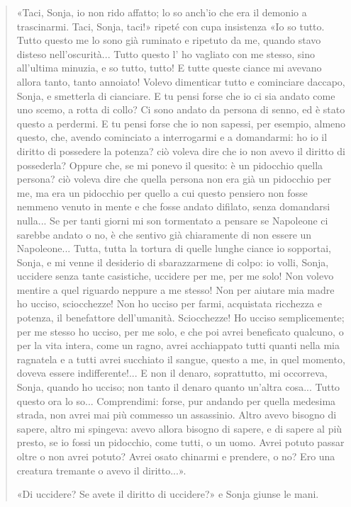 \documentclass{book}
\begin{document}
\begin{quote}
«Taci, Sonja, io non rido affatto; lo so anch’io che era il demonio a trascinarmi. Taci, Sonja,
taci!» ripeté con cupa insistenza «Io so tutto. Tutto questo me lo sono già ruminato e ripetuto
da me, quando stavo disteso nell’oscurità... Tutto questo l' ho vagliato con me stesso, sino
all'ultima minuzia, e so tutto, tutto! E tutte queste ciance mi avevano allora tanto, tanto
annoiato! Volevo dimenticar tutto e cominciare daccapo, Sonja, e smetterla di cianciare. E tu
pensi forse che io ci sia andato come uno scemo, a rotta di collo? Ci sono andato da persona di
senno, ed è stato questo a perdermi. E tu pensi forse che io non sapessi, per esempio, almeno
questo, che, avendo cominciato a interrogarmi e a domandarmi: ho io il diritto di possedere la
potenza? ciò voleva dire che io non avevo il diritto di possederla? Oppure che, se mi ponevo il
quesito: è un pidocchio quella persona? ciò voleva dire che quella persona non era già un
pidocchio per me, ma era un pidocchio per quello a cui questo pensiero non fosse nemmeno
venuto in mente e che fosse andato difilato, senza domandarsi nulla... Se per tanti giorni mi son
tormentato a pensare se Napoleone ci sarebbe andato o no, è che sentivo già chiaramente di
non essere un Napoleone... Tutta, tutta la tortura di quelle lunghe ciance io sopportai, Sonja, e
mi venne il desiderio di sbarazzarmene di colpo: io volli, Sonja, uccidere senza tante casistiche,
uccidere per me, per me solo! Non volevo mentire a quel riguardo neppure a me stesso! Non
per aiutare mia madre ho ucciso, sciocchezze! Non ho ucciso per farmi, acquistata ricchezza e
potenza, il benefattore dell'umanità. Sciocchezze! Ho ucciso semplicemente; per me stesso ho
ucciso, per me solo, e che poi avrei beneficato qualcuno, o per la vita intera, come un ragno, avrei acchiappato tutti quanti nella mia ragnatela e a tutti avrei succhiato il sangue, questo a me,
in quel momento, doveva essere indifferente!... E non il denaro, soprattutto, mi occorreva,
Sonja, quando ho ucciso; non tanto il denaro quanto un'altra cosa... Tutto questo ora lo so...
Comprendimi: forse, pur andando per quella medesima strada, non avrei mai più commesso un
assassinio. Altro avevo bisogno di sapere, altro mi spingeva: avevo allora bisogno di sapere, e
di sapere al più presto, se io fossi un pidocchio, come tutti, o un uomo. Avrei potuto passar
oltre o non avrei potuto? Avrei osato chinarmi e prendere, o no? Ero una creatura tremante o
avevo il diritto...».

«Di uccidere? Se avete il diritto di uccidere?» e Sonja giunse le mani.


\end{quote}
\end{document}
